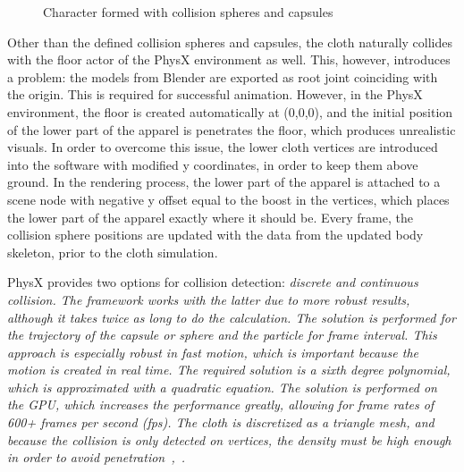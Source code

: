 \begin{figure}[h]
\centerline{}
\caption{Character formed with collision spheres and capsules}
\label{fig:colliding_human_body}
\end{figure}

Other than the defined collision spheres and capsules, the cloth naturally collides with the floor actor of the PhysX environment as well. This, however, introduces a problem: the models from Blender are exported as root joint coinciding with the origin. This is required for successful animation. However, in the PhysX environment, the floor is created automatically at (0,0,0), and the initial position of the lower part of the apparel is penetrates the floor, which produces unrealistic visuals. In order to overcome this issue, the lower cloth vertices are introduced into the software with modified y coordinates, in order to keep them above ground. In the rendering process, the lower part of the apparel is attached to a scene node with negative y offset equal to the boost in the vertices, which places the lower part of the apparel exactly where it should be. Every frame, the collision sphere positions are updated with the data from the updated body skeleton, prior to the cloth simulation. 

PhysX provides two options for collision detection: \em{discrete} and \em{continuous} collision. The framework works with the latter due to more robust results, although it takes twice as long to do the calculation. The solution is performed for the trajectory of the capsule or sphere and the particle for frame interval. This approach is especially robust in fast motion, which is important because the motion is created in real time. The required solution is a sixth degree polynomial, which is approximated with a quadratic equation. The solution is performed on the GPU, which increases the performance greatly, allowing for frame rates of 600+ frames per second (fps). The cloth is discretized as a triangle mesh, and because the collision is only detected on vertices, the density must be high enough in order to avoid penetration~\cite{Kim2011},~\cite{Tonge2010}. 

